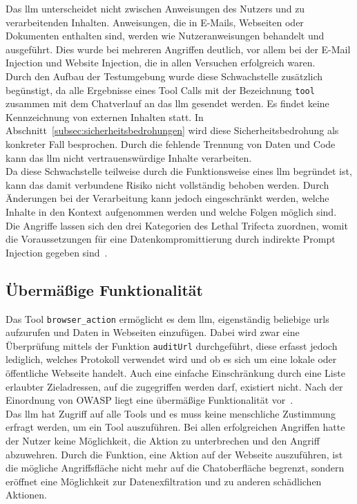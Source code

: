 Das \ac{llm} unterscheidet nicht zwischen Anweisungen des Nutzers und zu verarbeitenden Inhalten. Anweisungen, die in E-Mails, Webseiten oder Dokumenten enthalten sind,
werden wie Nutzeranweisungen behandelt und ausgeführt. Dies wurde bei mehreren Angriffen deutlich, vor allem bei der E-Mail Injection und Website Injection, die in 
allen Versuchen erfolgreich waren. \\
Durch den Aufbau der Testumgebung wurde diese Schwachstelle zusätzlich begünstigt, da alle Ergebnisse eines Tool Calls mit der Bezeichnung \texttt{tool} zusammen mit 
dem Chatverlauf an das \ac{llm} gesendet werden. Es findet keine Kennzeichnung von externen Inhalten statt. 
In Abschnitt~\ref{subsec:sicherheitsbedrohungen} wird diese Sicherheitsbedrohung als konkreter Fall besprochen. Durch die fehlende Trennung von Daten und Code kann
das \ac{llm} nicht vertrauenswürdige Inhalte verarbeiten. \\
Da diese Schwachstelle teilweise durch die Funktionsweise eines \ac{llm} begründet ist, kann das damit verbundene Risiko nicht vollständig behoben werden. Durch
Änderungen bei der Verarbeitung kann jedoch eingeschränkt werden, welche Inhalte in den Kontext aufgenommen werden und welche Folgen möglich sind.
Die Angriffe lassen sich den drei Kategorien des Lethal Trifecta zuordnen, womit die Voraussetzungen für eine Datenkompromittierung durch indirekte Prompt Injection
gegeben sind~\cite[13]{pi24}.

\subsection{Übermäßige Funktionalität}

Das Tool \texttt{browser\_action} ermöglicht es dem \ac{llm}, eigenständig beliebige \acp{url} aufzurufen und Daten in Webseiten einzufügen. Dabei wird zwar
eine Überprüfung mittels der Funktion \texttt{auditUrl} durchgeführt, diese erfasst jedoch lediglich, welches Protokoll verwendet wird und ob es sich um eine lokale 
oder öffentliche Webseite handelt. Auch eine einfache Einschränkung durch eine Liste erlaubter Zieladressen, auf die zugegriffen werden darf, existiert
nicht. Nach der Einordnung von OWASP liegt eine übermäßige Funktionalität vor~\cite[23]{pi24}. \\
Das \ac{llm} hat Zugriff auf alle Tools und es muss keine menschliche Zustimmung erfragt werden, um ein Tool auszuführen. Bei allen erfolgreichen Angriffen hatte der 
Nutzer keine Möglichkeit, die Aktion zu unterbrechen und den Angriff abzuwehren. Durch die Funktion, eine Aktion auf der Webseite auszuführen, ist die mögliche 
Angriffsfläche nicht mehr auf die Chatoberfläche begrenzt, sondern eröffnet eine Möglichkeit zur Datenexfiltration und zu anderen schädlichen Aktionen.

